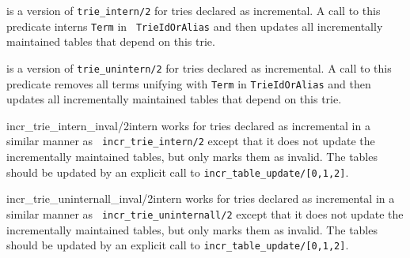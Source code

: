 \begin{description}
%
is a version of {\tt trie\_intern/2} for tries declared as
incremental.  A call to this predicate interns {\tt Term} in {\tt
  TrieIdOrAlias} and then updates all incrementally maintained tables
that depend on this trie.

%
is a version of {\tt trie\_unintern/2} for tries declared as
incremental.  A call to this predicate removes all terms unifying with
{\tt Term} in {\tt TrieIdOrAlias} and then updates all incrementally
maintained tables that depend on this trie.

{incr\_trie\_intern\_inval/2}{intern}
%
works for tries declared as incremental in a similar manner as {\tt
  incr\_trie\_intern/2} except that it does not update the
incrementally maintained tables, but only marks them as invalid. The
tables should be updated by an explicit call to {\tt incr\_table\_update/[0,1,2]}.

{incr\_trie\_uninternall\_inval/2}{intern}
%
works for tries declared as incremental in a similar manner as {\tt
  incr\_trie\_uninternall/2} except that it does not update the
incrementally maintained tables, but only marks them as invalid. The
tables should be updated by an explicit call to {\tt incr\_table\_update/[0,1,2]}.

\end{description}

